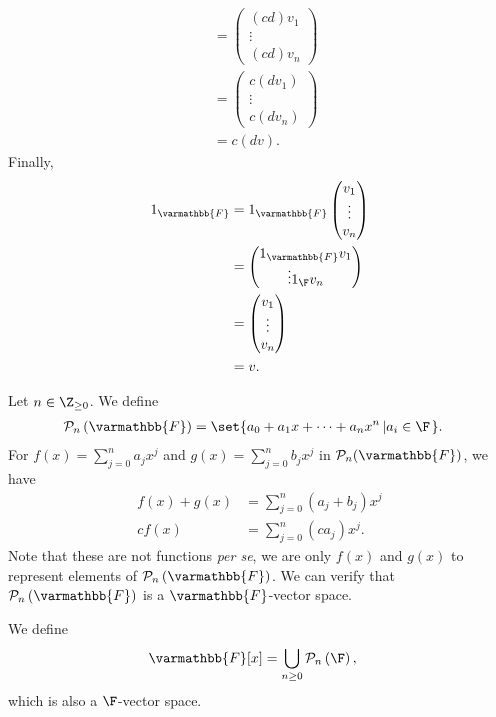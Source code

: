 \documentclass[12pt]{mypackage}
\renewcommand*{\mathbb}[1]{\varmathbb{#1}}
\begin{document}
\begin{example}[$\F^{n}$]
\begin{align*}
          &= \begin{pmatrix}(cd)v_1 \\\vdots\\(cd)v_n\end{pmatrix}\\
          &= \begin{pmatrix}c\left(dv_1\right) \\\vdots\\c\left(dv_n\right)\end{pmatrix}\\
          &= c\left(dv\right).
  \end{align*}
  Finally,
  \begin{align*}
    1_{\mathbb{F}} &= 1_{\mathbb{F}} \begin{pmatrix}v_1\\\vdots\\v_n\end{pmatrix}\\
                   &= \begin{pmatrix}1_{\mathbb{F}}v_1\\\vdots 1_{\F}v_n\end{pmatrix}\\
                   &= \begin{pmatrix}v_1\\\vdots\\v_n\end{pmatrix}\\
                   &= v.
  \end{align*}
\end{example}
\begin{example}[Polynomials]
  Let $n\in \Z_{\geq 0}$. We define
  \begin{align*}
    \mathcal{P}_{n}\left(\mathbb{F}\right) &= \set{a_0 + a_1x + \cdots + a_nx^n\left|a_i\in \F\right.}.
  \end{align*}
  For $f(x) = \sum_{j=0}^{n}a_jx^j$ and $g(x) = \sum_{j=0}^{n}b_jx^j$ in $\mathcal{P}_n(\mathbb{F})$, we have
  \begin{align*}
    f(x) + g(x) &= \sum_{j=0}^{n}\left(a_j + b_j\right)x^j\\
    cf(x) &= \sum_{j=0}^{n}\left(ca_j\right)x^j.
  \end{align*}
  Note that these are not functions \textit{per se}, we are only $f(x)$ and $g(x)$ to represent elements of $\mathcal{P}_n\left(\mathbb{F}\right)$. We can verify that $\mathcal{P}_n\left(\mathbb{F}\right)$ is a $\mathbb{F}$-vector space.\newline

  We define
  \begin{align*}
    \mathbb{F}[x] &= \bigcup_{n\geq 0}\mathcal{P}_n\left(\F\right),
  \end{align*}
  which is also a $\F$-vector space.
\end{example}
\end{document}
